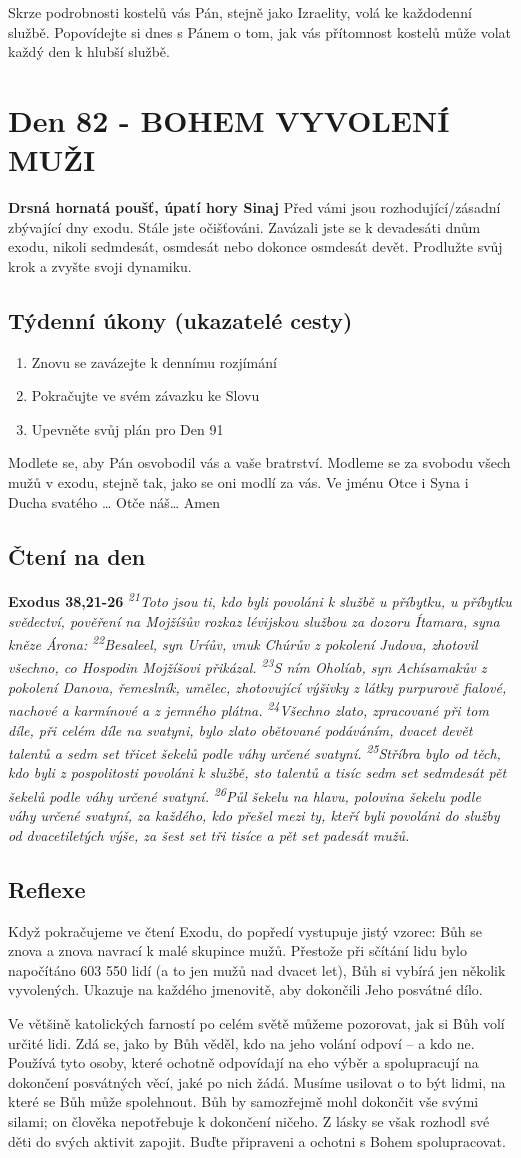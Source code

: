 \documentclass[11pt]{article}
\newcommand{\zacatekDvanactyTyden}{
\textbf{Drsná hornatá poušť, úpatí hory Sinaj} \newline 
Před vámi jsou rozhodující/zásadní zbývající dny exodu. Stále jste očišťováni. Zavázali jste se k devadesáti dnům exodu, nikoli sedmdesát, osmdesát nebo dokonce osmdesát devět. Prodlužte svůj krok a zvyšte svoji dynamiku.

\subsection*{Týdenní úkony (ukazatelé cesty)}
\begin{enumerate}
  \item Znovu se zavázejte k dennímu rozjímání
  \item Pokračujte ve svém závazku ke Slovu
  \item Upevněte svůj plán pro Den 91
\end{enumerate}
Modlete se, aby Pán osvobodil vás a vaše bratrství. \newline
Modleme se za svobodu všech mužů v exodu, stejně tak, jako se oni modlí za vás.\newline
Ve jménu Otce i Syna i Ducha svatého …  Otče náš… Amen
}
\begin{document}
Skrze podrobnosti kostelů vás Pán, stejně jako Izraelity, volá ke každodenní službě. Popovídejte si dnes s Pánem o tom, jak vás
přítomnost kostelů může volat každý den k hlubší službě.


\newpage
\section{Den 82 - BOHEM VYVOLENÍ MUŽI}
\zacatekDvanactyTyden
\subsection*{Čtení na den}
\textbf{Exodus 38,21-26}
\newline
\textit{
\textsuperscript{21}Toto jsou ti, kdo byli povoláni k službě u příbytku, u příbytku svědectví, pověření na Mojžíšův rozkaz lévijskou službou za dozoru Ítamara, syna kněze Árona:
\textsuperscript{22}Besaleel, syn Uríův, vnuk Chúrův z pokolení Judova, zhotovil všechno, co Hospodin Mojžíšovi přikázal.
\textsuperscript{23}S ním Oholíab, syn Achísamakův z pokolení Danova, řemeslník, umělec, zhotovující výšivky z látky purpurově fialové, nachové a karmínové a z jemného plátna.
\textsuperscript{24}Všechno zlato, zpracované při tom díle, při celém díle na svatyni, bylo zlato obětované podáváním, dvacet devět talentů a sedm set třicet šekelů podle váhy určené svatyní.
\textsuperscript{25}Stříbra bylo od těch, kdo byli z pospolitosti povoláni k službě, sto talentů a tisíc sedm set sedmdesát pět šekelů podle váhy určené svatyní.
\textsuperscript{26}Půl šekelu na hlavu, polovina šekelu podle váhy určené svatyní, za každého, kdo přešel mezi ty, kteří byli povoláni do služby od dvacetiletých výše, za šest set tři tisíce a pět set padesát mužů.
}

\subsection*{Reflexe}
Když pokračujeme ve čtení Exodu, do popředí vystupuje jistý vzorec: Bůh se znova a znova navrací k malé skupince
mužů. Přestože při sčítání lidu bylo napočítáno 603 550 lidí (a to jen mužů nad dvacet let), Bůh si vybírá jen několik
vyvolených. Ukazuje na každého jmenovitě, aby dokončili Jeho posvátné dílo.

Ve většině katolických farností po celém světě můžeme pozorovat, jak si Bůh volí určité lidi. Zdá se, jako by Bůh
věděl, kdo na jeho volání odpoví – a kdo ne. Používá tyto osoby, které ochotně odpovídají na eho výběr a spolupracují
na dokončení posvátných věcí, jaké po nich žádá. Musíme usilovat o to být lidmi, na které se Bůh může spolehnout.
Bůh by samozřejmě mohl dokončit vše svými silami; on člověka nepotřebuje k dokončení ničeho. Z lásky se však
rozhodl své děti do svých aktivit zapojit. Buďte připraveni a ochotni s Bohem spolupracovat.
\end{document}

